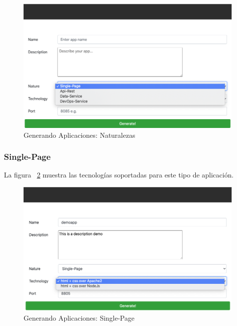 \documentclass[a4paper,11pt]{book}
\begin{document}
\begin{figure}[H]
\centering
\includegraphics[scale=0.5]{imagenes/casouso_a/6.png}
\caption{  Generando Aplicaciones: Naturalezas  }
\label{6}
\end{figure}

\newpage

\subsubsection{Single-Page}
La figura ~\ref{7} muestra las tecnologías soportadas para este tipo de aplicación.  

\begin{figure}[H]
\centering
\includegraphics[scale=0.5]{imagenes/casouso_a/7.png}
\caption{ Generando Aplicaciones: Single-Page   }
\label{7}
\end{figure}
~\\
~\\
~\\
\end{document}
